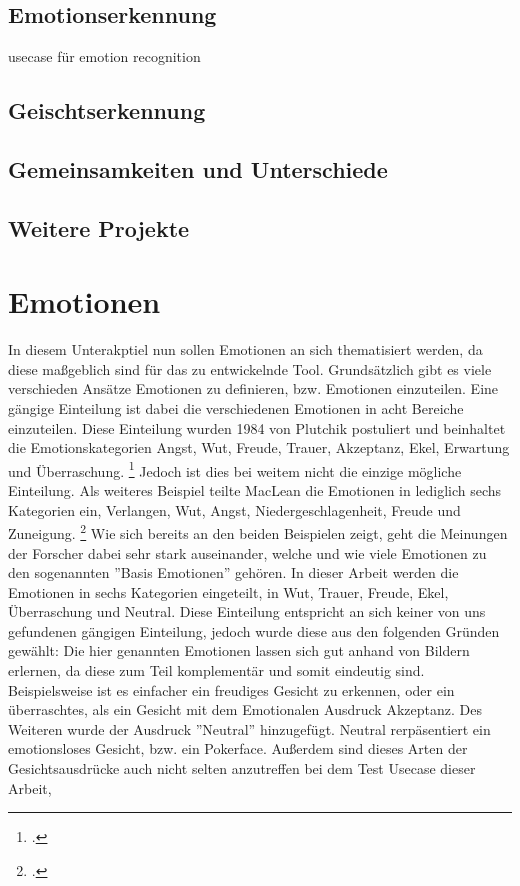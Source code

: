 \documentclass[12pt, a4paper]{scrbook}
\begin{document}
\subsection{Emotionserkennung}

usecase für emotion recognition

\subsection{Geischtserkennung}
\subsection{Gemeinsamkeiten und Unterschiede}
\subsection{Weitere Projekte}
\section{Emotionen}
In diesem Unterakptiel nun sollen Emotionen an sich thematisiert werden, da diese maßgeblich sind für das zu entwickelnde Tool. Grundsätzlich gibt es viele verschieden Ansätze Emotionen zu definieren, bzw. Emotionen einzuteilen. Eine gängige Einteilung ist dabei die verschiedenen Emotionen in acht Bereiche einzuteilen. Diese Einteilung wurden 1984 von Plutchik postuliert und beinhaltet die Emotionskategorien Angst, Wut, Freude, Trauer, Akzeptanz, Ekel, Erwartung und Überraschung.
\footcite[Vgl. ][3]{FaceRec}
Jedoch ist dies bei weitem nicht die einzige mögliche Einteilung. Als weiteres Beispiel teilte MacLean  die Emotionen in lediglich sechs Kategorien ein, Verlangen, Wut, Angst, Niedergeschlagenheit, Freude und Zuneigung.
\footcite[Vgl. ][3]{FaceRec}
Wie sich bereits an den beiden Beispielen zeigt, geht die Meinungen der Forscher  dabei sehr stark auseinander, welche und wie viele Emotionen zu den sogenannten ''Basis Emotionen'' gehören. In dieser Arbeit werden die Emotionen in sechs Kategorien eingeteilt, in Wut, Trauer, Freude, Ekel, Überraschung und Neutral. Diese Einteilung entspricht an sich keiner von uns gefundenen gängigen Einteilung, jedoch wurde diese aus den folgenden Gründen gewählt:
Die hier genannten Emotionen lassen sich gut anhand von Bildern erlernen, da diese zum Teil komplementär und somit eindeutig sind. Beispielsweise ist es einfacher ein freudiges Gesicht zu erkennen, oder ein überraschtes, als ein Gesicht mit dem Emotionalen Ausdruck Akzeptanz. Des Weiteren wurde der Ausdruck ''Neutral'' hinzugefügt. Neutral rerpäsentiert ein emotionsloses Gesicht, bzw. ein Pokerface. Außerdem sind dieses Arten der Gesichtsausdrücke auch nicht selten anzutreffen bei dem Test Usecase dieser Arbeit,
\end{document}
